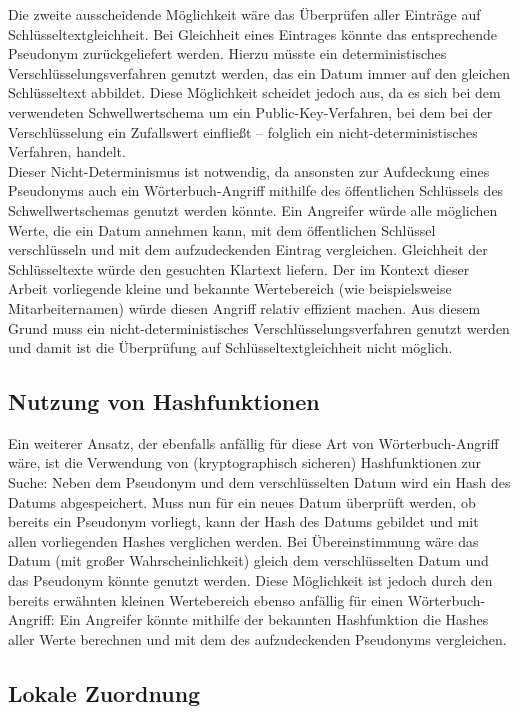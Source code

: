 Die zweite ausscheidende Möglichkeit wäre das Überprüfen aller Einträge auf Schlüsseltextgleichheit. Bei Gleichheit eines Eintrages könnte das entsprechende Pseudonym zurückgeliefert werden. Hierzu müsste ein deterministisches Verschlüsselungsverfahren genutzt werden, das ein Datum immer auf den gleichen Schlüsseltext abbildet. Diese Möglichkeit scheidet jedoch aus, da es sich bei dem verwendeten Schwellwertschema um ein Public-Key-Verfahren, bei dem bei der Verschlüsselung ein Zufallswert einfließt -- folglich ein nicht-deterministisches Verfahren, handelt.\\
Dieser Nicht-Determinismus ist notwendig, da ansonsten zur Aufdeckung eines Pseudonyms auch ein Wörterbuch-Angriff mithilfe des öffentlichen Schlüssels des Schwellwertschemas genutzt werden könnte. Ein Angreifer würde alle möglichen Werte, die ein Datum annehmen kann, mit dem öffentlichen Schlüssel verschlüsseln und mit dem aufzudeckenden Eintrag vergleichen. Gleichheit der Schlüsseltexte würde den gesuchten Klartext liefern. Der im Kontext dieser Arbeit vorliegende kleine und bekannte Wertebereich (wie beispielsweise Mitarbeiternamen) würde diesen Angriff relativ effizient machen. Aus diesem Grund muss ein nicht-deterministisches Verschlüsselungsverfahren genutzt werden und damit ist die Überprüfung auf Schlüsseltextgleichheit nicht möglich.


\subsection{Nutzung von Hashfunktionen}

Ein weiterer Ansatz, der ebenfalls anfällig für diese Art von Wörterbuch-Angriff wäre, ist die Verwendung von (kryptographisch sicheren) Hashfunktionen zur Suche: Neben dem Pseudonym und dem verschlüsselten Datum wird ein Hash des Datums abgespeichert. Muss nun für ein neues Datum überprüft werden, ob bereits ein Pseudonym vorliegt, kann der Hash des Datums gebildet und mit allen vorliegenden Hashes verglichen werden. Bei Übereinstimmung wäre das Datum (mit großer Wahrscheinlichkeit) gleich dem verschlüsselten Datum und das Pseudonym könnte genutzt werden. Diese Möglichkeit ist jedoch durch den bereits erwähnten kleinen Wertebereich ebenso anfällig für einen Wörterbuch-Angriff: Ein Angreifer könnte mithilfe der bekannten Hashfunktion die Hashes aller Werte berechnen und mit dem des aufzudeckenden Pseudonyms vergleichen.

\subsection{Lokale Zuordnung}

